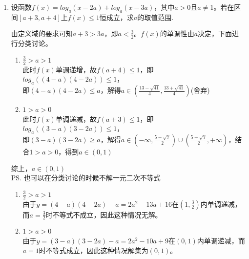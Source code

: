 \begin{enumerate}
    \item 设函数$f(x) = log_a(x-2a) + log_a(x-3a)$，其中$a > 0 \mbox{且} a \neq 1$。若在区间$[a+3, a+4]$上$f(x) \leq 1$恒成立，求$a$的取值范围.
    \begin{jieda}
        由定义域的要求可知$a+3 > 3a$，即$a < \frac{3}{2}$。$f(x)$的单调性由$a$决定，下面进行分类讨论。
        \begin{enumerate}
            \item $\frac{3}{2} > a > 1$ \\
            此时$f(x)$单调递增，故$f(a+4) \leq 1$，即$log_a((4-a)(4-2a)) \leq 1$，\\
            即$(4-a)(4-2a) \leq a$，解得$a \in (\frac{13-\sqrt{41}}{4}, \frac{13+\sqrt{41}}{4})$(舍弃)
            \item $1 > a > 0$ \\
            此时$f(x)$单调递减，故$f(a+3) \leq 1$，即$log_a((3-a)(3-2a)) \leq 1$，\\
            即$(3-a)(3-2a) \geq a$，解得$a \in (-\infty, \frac{5-\sqrt{7}}{2}) \cup (\frac{5+\sqrt{7}}{2}, +\infty)$，结合$1 > a > 0$，得到$a \in (0, 1)$
        \end{enumerate}
        综上，$a \in (0, 1)$\\
        \ps 也可以在分类讨论的时候不解一元二次不等式
        \begin{enumerate}
            \item $\frac{3}{2} > a > 1$ \\
            由于$y = (4-a)(4-2a) - a = 2a^2-13a+16$在$(1, \frac{3}{2})$内单调递减，而$a = \frac{3}{2}$时不等式不成立，因此这种情况无解。
            \item $1 > a > 0$ \\
            由于$y = (3-a)(3-2a) - a = 2a^2-10a+9$在$(0, 1)$内单调递减，而$a = 1$时不等式成立，因此这种情况解集为$(0, 1)$。
        \end{enumerate}
    \end{jieda}
\end{enumerate}